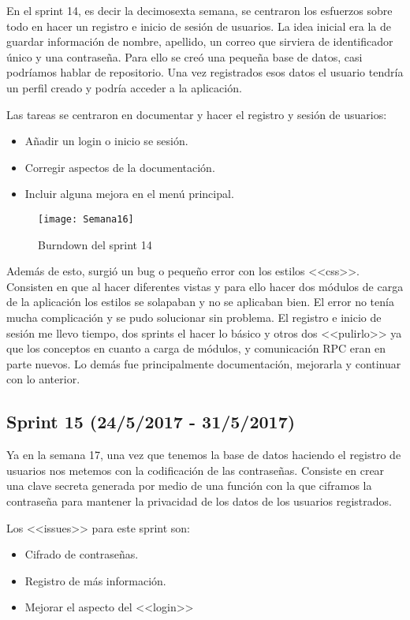 En el sprint 14, es decir la decimosexta semana, se centraron los esfuerzos sobre todo en hacer un registro e inicio de sesión de usuarios. La idea inicial era la de guardar información de nombre, apellido, un correo que sirviera de identificador único y una contraseña. Para ello se creó una pequeña base de datos, casi podríamos hablar de repositorio. Una vez registrados esos datos el usuario tendría un perfil creado y podría acceder a la aplicación.

Las tareas se centraron en documentar y hacer el registro y sesión de usuarios:
\begin{itemize}
\item Añadir un login o inicio se sesión.
\item Corregir aspectos de la documentación.
\item Incluir alguna mejora en el menú principal.
\end{itemize}

\begin{figure}[h]
\centering
\texttt{[image: Semana16]}
\caption{Burndown del sprint 14}
\label{fig:A.13}
\end{figure}

Además de esto, surgió un bug o pequeño error con los estilos <<css>>. Consisten en que al hacer diferentes vistas y para ello hacer dos módulos de carga de la aplicación los estilos se solapaban y no se aplicaban bien. El error no tenía mucha complicación y se pudo solucionar sin problema. 
El registro e inicio de sesión me llevo tiempo, dos sprints el hacer lo básico y otros dos <<pulirlo>> ya que los conceptos en cuanto a carga de módulos, y comunicación RPC eran en parte nuevos. Lo demás fue principalmente documentación, mejorarla y continuar con lo anterior.

\subsection{Sprint 15 (24/5/2017 - 31/5/2017)}

Ya en la semana 17, una vez que tenemos la base de datos haciendo el registro de usuarios nos metemos con la codificación de las contraseñas. Consiste en crear una clave secreta generada por medio de una función con la que ciframos la contraseña para mantener la privacidad de los datos de los usuarios registrados. 

Los <<issues>> para este sprint son:
\begin{itemize}
\item Cifrado de contraseñas.
\item Registro de más información.
\item Mejorar el aspecto del <<login>>
\end{itemize}

